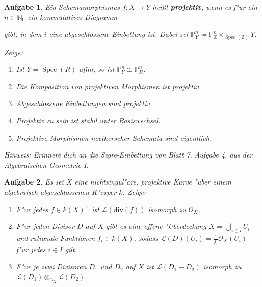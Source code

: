 \documentclass[paper = A4, fontsize=12pt, numbers=noendperiod, chapterprefix=true]{scrbook}
\theoremstyle{break}
\newtheorem{Aufg}{Aufgabe}
\theoremstyle{nonumberbreak}
\theoremstyle{nonumberplain}
\DeclareMathOperator{\Spec}{Spec}
\newcommand{\N}{\mathbb{N}}
\newcommand{\Z}{\mathbb{Z}}
\begin{document}
\begin{Aufg}
Ein Schemamorphismus $f\colon X \rightarrow Y$ hei\ss t \textbf{projektiv}, wenn es f"ur ein $n \in \N_0$ ein kommutatives Diagramm 
\begin{minipage}{4cm}
\end{minipage}
gibt, in dem $i$ eine abgeschlossene Einbettung ist. Dabei sei $\mathbb{P}^n_Y \coloneqq \mathbb{P}^n_{\Z} \times_{\Spec(\Z)} Y$.

Zeige:
\begin{enumerate}%
\item Ist $Y=\Spec(R)$ affin, so ist $\mathbb{P}^n_Y \cong \mathbb{P}^n_R$.
\item Die Komposition von projektiven Morphismen ist projektiv.
\item Abgeschlossene Einbettungen sind projektiv.
\item Projektiv zu sein ist stabil unter Basiswechsel.
\item Projektive Morphismen noetherscher Schemata sind eigentlich.
\end{enumerate}

\textit{Hinweis:} Erinnere dich an die Segre-Einbettung von Blatt 7, Aufgabe 4, aus der Algebraischen Geometrie I.
\end{Aufg}


\begin{Aufg}
Es sei $X$ eine nichtsingul"are, projektive Kurve "uber einem algebraisch abgeschlossenen K"orper $k$. Zeige:
\begin{enumerate}%
 \item F"ur jedes $f \in k(X)^\times$ ist $\mathcal{L}(\textrm{div}(f))$ isomorph zu $\mathcal{O}_X$.
 \item F"ur jeden Divisor $D$ auf $X$ gibt es eine offene "Uberdeckung $X = \bigcup_{i \in I} U_i$ %
 und rationale Funktionen $f_i \in k(X)$, sodass $\mathcal{L}(D)(U_i) = \frac{1}{f_i} \mathcal{O}_X(U_i)$ f"ur jedes $i \in I$ gilt.
 \item F"ur je zwei Divisoren $D_1$ und $D_2$ auf $X$ ist $\mathcal{L}(D_1 + D_2)$ isomorph zu $\mathcal{L}(D_1) \otimes_{\mathcal{O}_X} \mathcal{L}(D_2)$.
\end{enumerate}
\end{Aufg}
\end{document}
